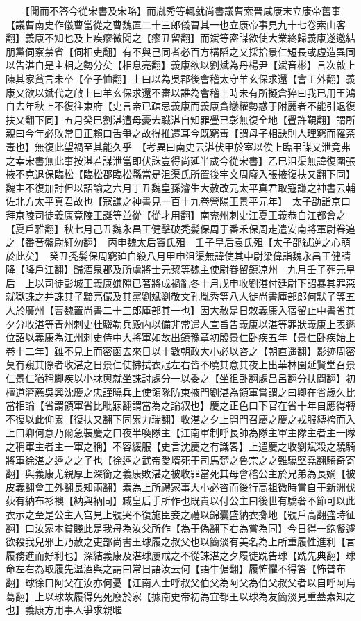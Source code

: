 　　【聞而不答今從宋書及宋略】而胤秀等輒就尚書議曹索晉咸康末立康帝舊事【議曹南史作儀曹當從之曹魏置二十三郎儀曹其一也立康帝事見九十七卷索山客翻】義康不知也及上疾瘳微聞之【瘳丑留翻】而斌等密謀欲使大業終歸義康遂邀結朋黨伺察禁省【伺相吏翻】有不與己同者必百方構䧟之又採拾景仁短長或虛造異同以告湛自是主相之勢分矣【相息亮翻】義康欲以劉斌為丹楊尹【斌音彬】言次啟上陳其家貧言未卒【卒子恤翻】上曰以為吳郡後會稽太守羊玄保求還【會工外翻】義康又欲以斌代之啟上曰羊玄保求還不審以誰為會稽上時未有所擬倉猝曰我已用王鴻自去年秋上不復往東府【史言帝已疎忌義康而義康貪戀權勢惑于附麗者不能引退復扶又翻下同】五月癸巳劉湛遭母憂去職湛自知罪舋已彰無復全地【舋許覲翻】謂所親曰今年必敗常日正賴口舌爭之故得推遷耳今既窮毒【謂母子相訣則人理窮而罹荼毒也】無復此望禍至其能久乎　【考異曰南史云湛伏甲於室以俟上臨弔謀又泄竟弗之幸宋書無此事按湛若謀泄當即伏誅豈得尚延半歲今從宋書】乙巳沮渠無諱復圍張掖不克退保臨松【臨松郡臨松縣當是沮渠氏所置後宇文周廢入張掖復扶又翻下同】魏主不復加討但以詔諭之六月丁丑魏皇孫濬生大赦改元太平真君取寇謙之神書云輔佐北方太平真君故也【寇謙之神書見一百十九卷營陽王景平元年】　太子劭詣京口拜京陵司徒義康竟陵王誕等並從【從才用翻】南兖州刺史江夏王義恭自江都會之【夏戶雅翻】秋七月己丑魏永昌王健擊破秃髪保周于番禾保周走遣安南將軍尉眷追之【番音盤尉紆勿翻】　丙申魏太后竇氏殂　壬子皇后袁氏殂【太子邵弑逆之心萌於此矣】　癸丑秃髪保周窮廹自殺八月甲申沮渠無諱使其中尉梁偉詣魏永昌王健請降【降戶江翻】歸酒泉郡及所虜將士元絜等魏主使尉眷留鎮凉州　九月壬子葬元皇后　上以司徒彭城王義康嫌隙已著將成禍亂冬十月戊申收劉湛付廷尉下詔暴其罪惡就獄誅之并誅其子黯亮儼及其黨劉斌劉敬文孔胤秀等八人徙尚書庫部郎何默子等五人於廣州【曹魏置尚書二十三郎庫部其一也】因大赦是日敕義康入宿留止中書省其夕分收湛等青州刺史杜驥勒兵殿内以備非常遣人宣旨告義康以湛等罪狀義康上表遜位詔以義康為江州刺史侍中大將軍如故出鎮豫章初殷景仁卧疾五年【景仁卧疾始上卷十二年】雖不見上而密函去來日以十數朝政大小必以咨之【朝直遥翻】影迹周密莫有窺其際者收湛之日景仁使拂拭衣冠左右皆不曉其意其夜上出華林園延賢堂召景仁景仁猶稱脚疾以小牀輿就坐誅討處分一以委之【坐徂卧翻處昌呂翻分扶問翻】初檀道濟薦吳興沈慶之忠謹曉兵上使領隊防東掖門劉湛為領軍嘗謂之曰卿在省歲久比當相論【省謂領軍省比毗寐翻謂當為之論叙也】慶之正色曰下官在省十年自應得轉不復以此仰累【復扶又翻下同累力瑞翻】收湛之夕上開門召慶之慶之戎服縛袴而入上曰卿何意乃爾急裝慶之曰夜半喚隊主【江南軍制呼長帥為隊主軍主隊主者主一隊之稱軍主者主一軍之稱】不容緩服【史言沈慶之有識畧】上遣慶之收劉斌殺之驍騎將軍徐湛之逵之之子也【徐逵之武帝愛壻死于司馬楚之魯宗之之難驍堅堯翻騎奇寄翻】與義康尤親厚上深銜之義康敗湛之被收罪當死其母會稽公主於兄弟為長嫡【被皮義翻會工外翻長知兩翻】素為上所禮家事大小必咨而後行高祖微時嘗自于新洲伐荻有納布衫襖【納與衲同】臧皇后手所作也既貴以付公主曰後世有驕奢不節可以此衣示之至是公主入宫見上號哭不復施臣妾之禮以錦囊盛納衣擲地【號戶高翻盛時征翻】曰汝家本貧賤此是我母為汝父所作【為于偽翻下右為嘗為同】今日得一飽餐遽欲殺我兒邪上乃赦之吏部尚書王球履之叔父也以簡淡有美名為上所重履性進利【言履務進而好利也】深結義康及湛球屢戒之不從誅湛之夕履徒跣告球【跣先典翻】球命左右為取履先温酒與之謂曰常日語汝云何【語牛倨翻】履怖懼不得答【怖普布翻】球徐曰阿父在汝亦何憂【江南人士呼叔父伯父為阿父為伯父叔父者以自呼阿烏葛翻】上以球故履得免死廢於家【據南史帝初為宜都王以球為友簡淡見重蓋素知之也】義康方用事人爭求親暱